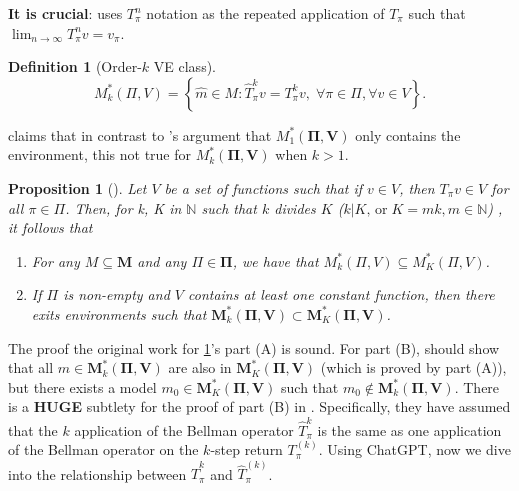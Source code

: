 \documentclass[a4paper]{article}
\theoremstyle{definition}
\newtheorem{definition}{Definition}
\theoremstyle{remark}
\theoremstyle{plain}
\newtheorem{proposition}{Proposition}
\newcommand{\bM}{\mathbf{M}}
\newcommand{\bV}{\mathbf{V}}
\newcommand{\bPi}{\mathbf{\Pi}}
\newcommand{\N}{\mathbb{N}}
\begin{document}
\textbf{It is crucial}: \cite{grimm2021proper} uses $T_\pi^n$ notation as the repeated application of $T_\pi$ such that $\lim_{n \to \infty} T^n_\pi v = v_\pi$.
%
\begin{definition}[Order-$k$ VE class]
    \begin{equation*}
        M_k^*(\Pi, V) = \left\{\hat{m} \in M: \hat{T}_\pi^k v = T_\pi^k v, \; \forall \pi \in \Pi, \forall v \in V \right\}.
    \end{equation*}
\end{definition}
%
\citet{grimm2021proper} claims that in contrast to \citet{grimm2020value}'s argument that $M_1^*(\bPi, \bV)$ only contains the environment, this not true for $M_k^*(\bPi, \bV)$ when $k > 1$.
%
\begin{proposition}[{\normalfont\citet[Proposition 1]{grimm2021proper}}]
    \label{prpstn:ordr-k-VE}
    Let $V$ be a set of functions such that if $v \in V$, then $T_\pi v \in V$ for all $\pi \in \Pi$. Then, for k, K in $\N$ such that $k$ divides $K$ ($k | K, \, \mathrm{or} \; K = m k, m \in \N$) , it follows that
    \begin{enumerate}[label=(\Alph*)]
        \item For any $M \subseteq \bM$ and any $\Pi \in \bPi$, we have that $M^*_k(\Pi, V) \subseteq M^*_K(\Pi, V)$.
        \item If $\Pi$ is non-empty and $V$ contains at least one constant function, then there exits environments such that $\bM^*_k(\bPi, \bV) \subset \bM^*_K(\bPi, \bV)$.
    \end{enumerate}
\end{proposition}
%
The proof the original work for \cref{prpstn:ordr-k-VE}'s part (A) is sound. For part (B), \citet{grimm2021proper} should show that all $m \in \bM^*_k(\bPi, \bV)$ are also in $\bM^*_K(\bPi, \bV)$ (which is proved by part (A)), but there exists a model $m_0 \in \bM^*_K(\bPi, \bV)$ such that $m_0 \notin \bM^*_k(\bPi, \bV)$. There is a \textbf{HUGE} subtlety for the proof of part (B) in \citet{grimm2021proper}. Specifically, they have assumed that the $k$ application of the Bellman operator $\hat{T}_\pi^k$ is the same as one application of the Bellman operator on the $k$-step return $T_\pi^{(k)}$. Using ChatGPT, now we dive into the relationship between $\hat{T}_\pi^k$ and $\hat{T}_\pi^{(k)}$.
\end{document}
